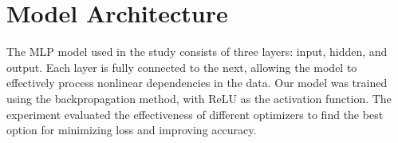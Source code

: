 \documentclass[journal,onecolumn]{IEEEtran}
\begin{document}
%






\section{Model Architecture}


The MLP model used in the study consists of three layers: input, hidden, and output. Each layer is fully connected to the next, allowing the model to effectively process nonlinear dependencies in the data. Our model was trained using the backpropagation method, with ReLU as the activation function. The experiment evaluated the effectiveness of different optimizers to find the best option for minimizing loss and improving accuracy.
\end{document}
